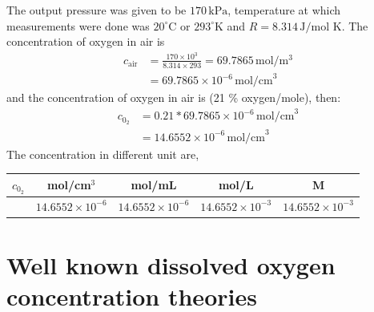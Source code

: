 \documentclass[12pt]{book}
\begin{document}
The output pressure was given to be $170\,\textrm{kPa}$, temperature at which measurements were done was $20^\circ \textrm{C}$ or $293^\circ\textrm{K}$ and $R=8.314\,\textrm{J/mol K}$. The concentration of oxygen in air is
\begin{align}
c_{\textrm{air}}&=\frac{170\times 10^3}{8.314\times 293} = 69.7865\,\textrm{mol}/\textrm{m}^3\\
&=69.7865\times 10^{-6}\,\textrm{mol/cm}^3\nonumber
\end{align}
and the concentration of oxygen in air is (21 \% oxygen/mole), then:
\begin{align}
c_{0_2}&=0.21*69.7865\times 10^{-6}\,\textrm{mol/cm}^3\\
&=14.6552\times 10^{-6}\,\textrm{mol/cm}^3\nonumber
\end{align} 
The concentration in different unit are,
\begin{center}
\begin{tabular}{|c|c|c|c|c|}
\hline
$c_{0_2}$ & mol/cm$^3$ & mol/mL & mol/L & M  \\
\hline
			& $14.6552\times 10^{-6}$ & $14.6552\times 10^{-6}$ & $14.6552\times 10^{-3}$ & $14.6552\times 10^{-3}$ \\
\hline
\end{tabular}
\end{center} 

\section{Well known dissolved oxygen concentration theories}
\end{document}
